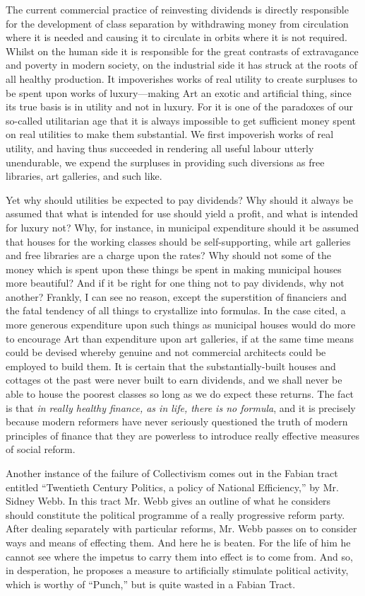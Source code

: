 \documentclass{book}
\begin{document}
The current commercial practice of reinvesting dividends is directly responsible for the development of class separation by withdrawing money from circulation where it is needed and causing it to circulate in orbits where it is not required. Whilst on the human side it is responsible for the great contrasts of extravagance and poverty in modern society, on the industrial side it has struck at the roots of all healthy production. It impoverishes works of real utility to create surpluses to be spent upon works of luxury—making Art an exotic and artificial thing, since its true basis is in utility and not in luxury. For it is one of the paradoxes of our so-called utilitarian age that it is always impossible to get sufficient money spent on real utilities to make them substantial. We first impoverish works of real utility, and having thus succeeded in rendering all useful labour utterly unendurable, we expend the surpluses in providing such diversions as free libraries, art galleries, and such like.

Yet why should utilities be expected to pay dividends? Why should it always be assumed that what is intended for use should yield a profit, and what is intended for luxury not? Why, for instance, in municipal expenditure should it be assumed that houses for the working classes should be self-supporting, while art galleries and free libraries are a charge upon the rates? Why should not some of the money which is spent upon these things be spent in making municipal houses more beautiful? And if it be right for one thing not to pay dividends, why not another? Frankly, I can see no reason, except the superstition of financiers and the fatal tendency of all things to crystallize into formulas. In the case cited, a more generous expenditure upon such things as municipal houses would do more to encourage Art than expenditure upon art galleries, if at the same time means could be devised whereby genuine and not commercial architects could be employed to build them. It is certain that the substantially-built houses and cottages ot the past were never built to earn dividends, and we shall never be able to house the poorest classes so long as we do expect these returns. The fact is that \emph{in really healthy finance, as in life, there is no formula}, and it is precisely because modern reformers have never seriously questioned the truth of modern principles of finance that they are powerless to introduce really effective measures of social reform.

Another instance of the failure of Collectivism comes out in the Fabian tract entitled “Twentieth Century Politics, a policy of National Efficiency,” by Mr. Sidney Webb. In this tract Mr. Webb gives an outline of what he considers should constitute the political programme of a really progressive reform party. After dealing separately with particular reforms, Mr. Webb passes on to consider ways and means of effecting them. And here he is beaten. For the life of him he cannot see where the impetus to carry them into effect is to come from. And so, in desperation, he proposes a measure to artificially stimulate political activity, which is worthy of “Punch,” but is quite wasted in a Fabian Tract.
\end{document}

